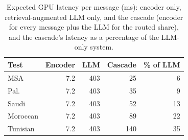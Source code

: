 \begin{table}[t]\centering\small\caption{Expected GPU latency per message (ms): encoder only, retrieval-augmented LLM only, and the cascade (encoder for every message plus the LLM for the routed share), and the cascade's latency as a percentage of the LLM-only system.}\label{tab:cost}
\begin{tabular}{lrrrr}\toprule
Test & Encoder & LLM & Cascade & \% of LLM \\\midrule
MSA & 7.2 & 403 & 25 & 6 \\
Pal. & 7.2 & 403 & 35 & 9 \\
Saudi & 7.2 & 403 & 52 & 13 \\
Moroccan & 7.2 & 403 & 89 & 22 \\
Tunisian & 7.2 & 403 & 140 & 35 \\
\bottomrule\end{tabular}\end{table}

